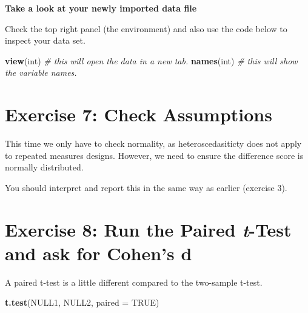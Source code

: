 \documentclass[
]{book}
\newenvironment{Shaded}{\begin{snugshade}}{\end{snugshade}}
\newcommand{\AttributeTok}[1]{\textcolor[rgb]{0.13,0.29,0.53}{#1}}
\newcommand{\CommentTok}[1]{\textcolor[rgb]{0.56,0.35,0.01}{\textit{#1}}}
\newcommand{\ConstantTok}[1]{\textcolor[rgb]{0.56,0.35,0.01}{#1}}
\newcommand{\FunctionTok}[1]{\textcolor[rgb]{0.13,0.29,0.53}{\textbf{#1}}}
\newcommand{\NormalTok}[1]{#1}
\newcommand{\OtherTok}[1]{\textcolor[rgb]{0.56,0.35,0.01}{#1}}
\newcommand{\SpecialCharTok}[1]{\textcolor[rgb]{0.81,0.36,0.00}{\textbf{#1}}}
\let\oldsection\section
\renewcommand{\section}{\needspace{5\baselineskip}\oldsection}
\begin{document}
\textbf{Take a look at your newly imported data file}

Check the top right panel (the environment) and also use the code below to inspect your data set.

\begin{Shaded}
\begin{Highlighting}[]
\FunctionTok{view}\NormalTok{(int) }\CommentTok{\# this will open the data in a new tab.}
\FunctionTok{names}\NormalTok{(int) }\CommentTok{\# this will show the variable names.}
\end{Highlighting}
\end{Shaded}

\section{Exercise 7: Check Assumptions}\label{exercise-7-check-assumptions}

This time we only have to check normality, as heteroscedasiticty does not apply to repeated measures designs. However, we need to ensure the difference score is normally distributed.

\begin{Shaded}
\end{Shaded}

You should interpret and report this in the same way as earlier (exercise 3).

\section{\texorpdfstring{Exercise 8: Run the Paired \emph{t}-Test and ask for Cohen's d}{Exercise 8: Run the Paired t-Test and ask for Cohen's d}}\label{exercise-8-run-the-paired-t-test-and-ask-for-cohens-d}

A paired t-test is a little different compared to the two-sample t-test.

\begin{Shaded}
\begin{Highlighting}[]
\FunctionTok{t.test}\NormalTok{(NULL1, NULL2, }\AttributeTok{paired =} \ConstantTok{TRUE}\NormalTok{)}
\end{Highlighting}
\end{Shaded}
\end{document}
